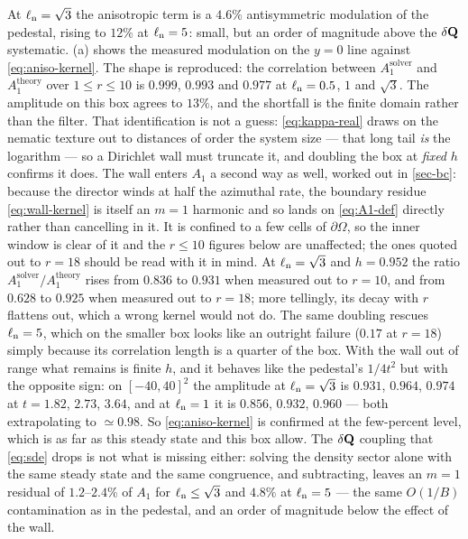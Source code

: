 \documentclass[a5paper]{article}
\begin{document}
At $\ell_{\rm n}=\sqrt3$ the anisotropic term is a $4.6\%$ antisymmetric modulation of the pedestal, rising to $12\%$ at $\ell_{\rm n}=5$: small, but an order of magnitude above the $\delta\mathbf{Q}$ systematic. (a) shows the measured modulation on the $y=0$ line against \eqref{eq:aniso-kernel}. The shape is reproduced: the correlation between $A_1^\mathrm{solver}$ and $A_1^\mathrm{theory}$ over $1\le r\le10$ is $0.999$, $0.993$ and $0.977$ at $\ell_{\rm n} = 0.5$, $1$ and $\sqrt3$. The amplitude on this box agrees to $13\%$, and the shortfall is the finite domain rather than the filter. That identification is not a guess: \eqref{eq:kappa-real} draws on the nematic texture out to distances of order the system size --- that long tail \emph{is} the logarithm --- so a Dirichlet wall must truncate it, and doubling the box at \emph{fixed} $h$ confirms it does. The wall enters $A_1$ a second way as well, worked out in \cref{sec-bc}: because the director winds at half the azimuthal rate, the boundary residue \eqref{eq:wall-kernel} is itself an $m=1$ harmonic and so lands on \eqref{eq:A1-def} directly rather than cancelling in it. It is confined to a few cells of $\partial\Omega$, so the inner window is clear of it and the $r\le10$ figures below are unaffected; the ones quoted out to $r=18$ should be read with it in mind. At $\ell_{\rm n}=\sqrt3$ and $h=0.952$ the ratio $A_1^\mathrm{solver}/A_1^\mathrm{theory}$ rises from $0.836$ to $0.931$ when measured out to $r=10$, and from $0.628$ to $0.925$ when measured out to $r=18$; more tellingly, its decay with $r$ flattens out, which a wrong kernel would not do. The same doubling rescues $\ell_{\rm n}=5$, which on the smaller box looks like an outright failure ($0.17$ at $r=18$) simply because its correlation length is a quarter of the box. With the wall out of range what remains is finite $h$, and it behaves like the pedestal's $1/4t^2$ but with the opposite sign: on $[-40,40]^2$ the amplitude at $\ell_{\rm n}=\sqrt3$ is $0.931$, $0.964$, $0.974$ at $t = 1.82$, $2.73$, $3.64$, and at $\ell_{\rm n}=1$ it is $0.856$, $0.932$, $0.960$ --- both extrapolating to $\simeq0.98$. So \eqref{eq:aniso-kernel} is confirmed at the few-percent level, which is as far as this steady state and this box allow. The $\delta\mathbf{Q}$ coupling that \eqref{eq:sde} drops is not what is missing either: solving the density sector alone with the same steady state and the same congruence, and subtracting, leaves an $m=1$ residual of $1.2$--$2.4\%$ of $A_1$ for $\ell_{\rm n}\le\sqrt3$ and $4.8\%$ at $\ell_{\rm n}=5$ --- the same $O(1/B)$ contamination as in the pedestal, and an order of magnitude below the effect of the wall.
\end{document}
